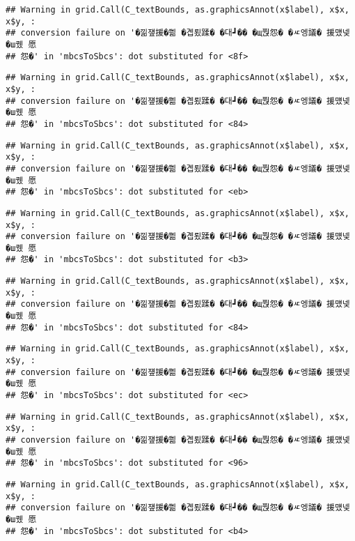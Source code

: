 \documentclass[
]{article}
\begin{document}
\begin{verbatim}
## Warning in grid.Call(C_textBounds, as.graphicsAnnot(x$label), x$x, x$y, :
## conversion failure on '�낆쟾援�쁾 �곕룄蹂� �대┛�� �щ쭩怨� �ㅼ엥議� 援먰넻�ш퀬 愿
## 怨�' in 'mbcsToSbcs': dot substituted for <8f>
\end{verbatim}

\begin{verbatim}
## Warning in grid.Call(C_textBounds, as.graphicsAnnot(x$label), x$x, x$y, :
## conversion failure on '�낆쟾援�쁾 �곕룄蹂� �대┛�� �щ쭩怨� �ㅼ엥議� 援먰넻�ш퀬 愿
## 怨�' in 'mbcsToSbcs': dot substituted for <84>
\end{verbatim}

\begin{verbatim}
## Warning in grid.Call(C_textBounds, as.graphicsAnnot(x$label), x$x, x$y, :
## conversion failure on '�낆쟾援�쁾 �곕룄蹂� �대┛�� �щ쭩怨� �ㅼ엥議� 援먰넻�ш퀬 愿
## 怨�' in 'mbcsToSbcs': dot substituted for <eb>
\end{verbatim}

\begin{verbatim}
## Warning in grid.Call(C_textBounds, as.graphicsAnnot(x$label), x$x, x$y, :
## conversion failure on '�낆쟾援�쁾 �곕룄蹂� �대┛�� �щ쭩怨� �ㅼ엥議� 援먰넻�ш퀬 愿
## 怨�' in 'mbcsToSbcs': dot substituted for <b3>
\end{verbatim}

\begin{verbatim}
## Warning in grid.Call(C_textBounds, as.graphicsAnnot(x$label), x$x, x$y, :
## conversion failure on '�낆쟾援�쁾 �곕룄蹂� �대┛�� �щ쭩怨� �ㅼ엥議� 援먰넻�ш퀬 愿
## 怨�' in 'mbcsToSbcs': dot substituted for <84>
\end{verbatim}

\begin{verbatim}
## Warning in grid.Call(C_textBounds, as.graphicsAnnot(x$label), x$x, x$y, :
## conversion failure on '�낆쟾援�쁾 �곕룄蹂� �대┛�� �щ쭩怨� �ㅼ엥議� 援먰넻�ш퀬 愿
## 怨�' in 'mbcsToSbcs': dot substituted for <ec>
\end{verbatim}

\begin{verbatim}
## Warning in grid.Call(C_textBounds, as.graphicsAnnot(x$label), x$x, x$y, :
## conversion failure on '�낆쟾援�쁾 �곕룄蹂� �대┛�� �щ쭩怨� �ㅼ엥議� 援먰넻�ш퀬 愿
## 怨�' in 'mbcsToSbcs': dot substituted for <96>
\end{verbatim}

\begin{verbatim}
## Warning in grid.Call(C_textBounds, as.graphicsAnnot(x$label), x$x, x$y, :
## conversion failure on '�낆쟾援�쁾 �곕룄蹂� �대┛�� �щ쭩怨� �ㅼ엥議� 援먰넻�ш퀬 愿
## 怨�' in 'mbcsToSbcs': dot substituted for <b4>
\end{verbatim}
\end{document}
